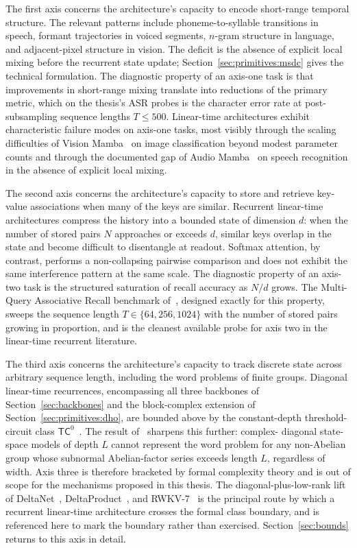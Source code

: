The first axis concerns the architecture's capacity to encode
short-range temporal structure. The relevant patterns include
phoneme-to-syllable transitions in speech, formant trajectories
in voiced segments, $n$-gram structure in language, and
adjacent-pixel structure in vision. The deficit is the absence
of explicit local mixing before the recurrent state update;
Section~\ref{sec:primitives:msdc} gives the technical
formulation. The diagnostic property of an axis-one task is that
improvements in short-range mixing translate into reductions of
the primary metric, which on the thesis's ASR probes is the
character error rate at post-subsampling sequence lengths
$T \le 500$. Linear-time architectures exhibit characteristic
failure modes on axis-one tasks, most visibly through the
scaling difficulties of Vision Mamba~\cite{zhu2024visionmamba}
on image classification beyond modest parameter counts and
through the documented gap of Audio
Mamba~\cite{erol2024audiomamba} on speech recognition in the
absence of explicit local mixing.

The second axis concerns the architecture's capacity to store and
retrieve key-value associations when many of the keys are similar.
Recurrent linear-time architectures compress the history into a
bounded state of dimension $d$: when the number of stored pairs $N$
approaches or exceeds $d$, similar keys overlap in the state and
become difficult to disentangle at readout. Softmax attention, by
contrast, performs a non-collapsing pairwise comparison and does not
exhibit the same interference pattern at the same scale. The
diagnostic property of an axis-two task is the structured saturation
of recall accuracy as $N/d$ grows. The Multi-Query Associative
Recall benchmark of~\citet{arora2023zoology}, designed exactly for
this property, sweeps the sequence length $T \in \{64, 256, 1024\}$
with the number of stored pairs growing in proportion, and is the
cleanest available probe for axis two in the linear-time recurrent
literature.

The third axis concerns the architecture's capacity to track
discrete state across arbitrary sequence length, including the word
problems of finite groups. Diagonal linear-time recurrences,
encompassing all three backbones of Section~\ref{sec:backbones} and
the block-complex extension of Section~\ref{sec:primitives:dho}, are
bounded above by the constant-depth threshold-circuit class
$\mathsf{TC}^{0}$~\cite{merrill2024illusion}. The result
of~\citet{sarrof2024expressive} sharpens this further: complex-
diagonal state-space models of depth $L$ cannot represent the word
problem for any non-Abelian group whose subnormal Abelian-factor
series exceeds length $L$, regardless of width. Axis three is
therefore bracketed by formal complexity theory and is out of scope
for the mechanisms proposed in this thesis. The diagonal-plus-low-rank lift of
DeltaNet~\cite{schlag2021deltanet, yang2024deltanet},
DeltaProduct~\cite{siems2025deltaproduct}, and
RWKV-7~\cite{peng2025rwkv7} is the principal route by which a
recurrent linear-time architecture crosses the formal class
boundary, and is referenced here to mark the boundary rather than
exercised. Section~\ref{sec:bounds} returns
to this axis in detail.

